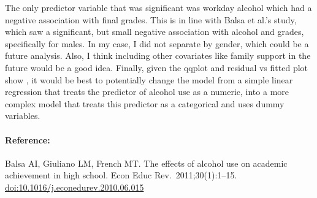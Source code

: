 \documentclass[]{article}
\let\oldparagraph\paragraph
\renewcommand{\paragraph}[1]{\oldparagraph{#1}\mbox{}}
\begin{document}
The only predictor variable that was significant was workday alcohol
which had a negative association with final grades. This is in line with
Balsa et al.'s study, which saw a significant, but small negative
association with alcohol and grades, specifically for males. In my case,
I did not separate by gender, which could be a future analysis. Also, I
think including other covariates like family support in the future would
be a good idea. Finally, given the qqplot and residual vs fitted plot
show , it would be best to potentially change the model from a simple
linear regression that treats the predictor of alcohol use as a numeric,
into a more complex model that treats this predictor as a categorical
and uses dummy variables.

\hypertarget{reference}{%
\paragraph{Reference:}\label{reference}}

Balsa AI, Giuliano LM, French MT. The effects of alcohol use on academic
achievement in high school. Econ Educ Rev.~2011;30(1):1--15.
\url{doi:10.1016/j.econedurev.2010.06.015}
\end{document}
